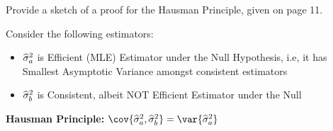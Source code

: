 Provide a sketch of a proof for the Hausman Principle, given on page 11.
\begin{prop*} Consider the following estimators:
    \begin{itemize}
        \item $\widehat{\sigma}_a^2$ is Efficient (MLE) Estimator under the Null Hypothesis, i.e, it has Smallest Asymptotic Variance amongst consistent estimators
        \item $\widehat{\sigma}_b^2$ is Consistent, albeit NOT Efficient Estimator under the Null
    \end{itemize}
    \begin{center}
        \textbf{Hausman Principle:} $\cov{\wh\sigma_a^2,\wh\sigma_b^2} = \var{\wh\sigma_a^2}$
    \end{center}
\end{prop*}